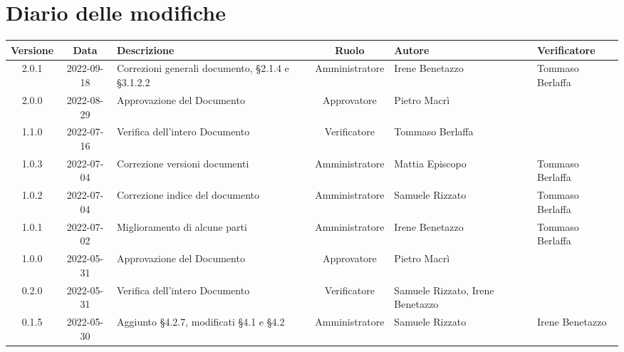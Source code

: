 \section*{Diario delle modifiche}
	\begin{center}
	\renewcommand{\arraystretch}{1.8} %
	\begin{longtable}{ |c|c|p{8em}|c|m{5em}|m{6em}| }
	\hline
	\textbf{Versione} & \textbf{Data} & \textbf{Descrizione} &  \textbf{Ruolo} &  \textbf{Autore} & \textbf{Verificatore}\\ %
	\hline %
	2.0.1 & 2022-09-18 & Correzioni generali documento, §2.1.4 e §3.1.2.2 & Amministratore & Irene \newline Benetazzo & Tommaso \newline Berlaffa\\
	\hline
	2.0.0 & 2022-08-29 & Approvazione del Documento & Approvatore & Pietro \newline Macrì & \\
	\hline
  	1.1.0 & 2022-07-16 & Verifica dell'intero Documento & Verificatore & Tommaso Berlaffa &  \\
	\hline
	1.0.3 & 2022-07-04 & Correzione versioni documenti & Amministratore & Mattia \newline Episcopo & Tommaso Berlaffa \\
	\hline
	1.0.2 & 2022-07-04 & Correzione indice del documento & Amministratore & Samuele \newline Rizzato & Tommaso Berlaffa \\
	\hline
	1.0.1 & 2022-07-02 & Miglioramento di alcune parti & Amministratore & Irene \newline Benetazzo & Tommaso Berlaffa \\
    \hline
	1.0.0 & 2022-05-31 & Approvazione del Documento & Approvatore & Pietro \newline Macrì & \\
	\hline
	0.2.0 & 2022-05-31 & Verifica dell'intero Documento & Verificatore & Samuele \newline Rizzato, Irene \newline Benetazzo & \\
	\hline
	0.1.5 & 2022-05-30 & Aggiunto §4.2.7, modificati §4.1 e §4.2 & Amministratore & Samuele \newline Rizzato & Irene \newline Benetazzo\\

\end{longtable}
\end{center}
